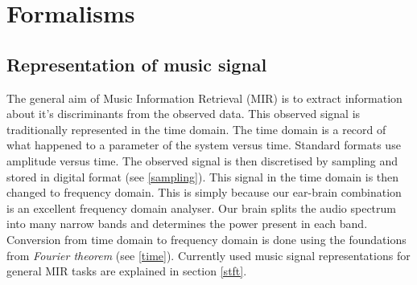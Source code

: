 




\chapter{Formalisms} %

\label{Chapter2} %







\section{Representation of music signal}

The general aim of Music Information Retrieval (MIR) is to extract information about it's discriminants from the observed data. This observed signal is traditionally represented in the time domain. The time domain is a record of what happened to a parameter of the system versus time. Standard formats use amplitude versus time. The observed signal is then discretised by sampling and stored in digital format (see \ref{sampling}). This signal in the time domain is then changed to frequency domain. This is simply because our ear-brain combination is an excellent frequency domain analyser. Our brain splits the audio spectrum into many narrow bands and determines the power present in each band. Conversion from time domain to frequency domain is done using the foundations from \textit{Fourier theorem} (see \ref{time}). Currently used music signal representations for general MIR tasks are explained in section \ref{stft}.


